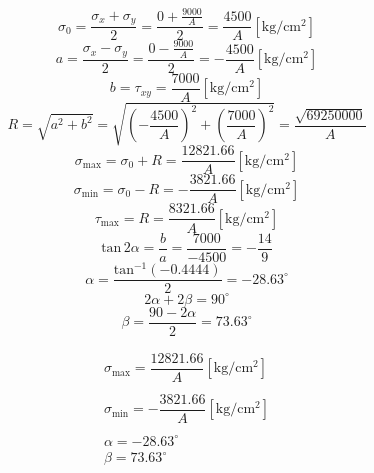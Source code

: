 \documentclass[letter,10pt,twoside]{article}
\begin{document}
\begin{equation*}
    \sigma_0 = \frac{\sigma_x + \sigma_y}{2}
             = \frac{0 + \frac{9000}{A}}{2}
             = \frac{4500}{A}[\text{kg}/\text{cm}^2]
\end{equation*}
\begin{equation*}
    a = \frac{\sigma_x - \sigma_y}{2}
      = \frac{0 - \frac{9000}{A}}{2}
      = - \frac{4500}{A}[\text{kg}/\text{cm}^2]
\end{equation*}
\begin{equation*}
    b = \tau_{xy}
      = \frac{7000}{A}[\text{kg}/\text{cm}^2]
\end{equation*}
\begin{equation*}
    R = \sqrt{a^2 + b^2}
      = \sqrt{\left(-\frac{4500}{A}\right)^2
        + \left(\frac{7000}{A}\right)^2}
      = \frac{\sqrt{69250000}}{A}
\end{equation*}
\begin{equation*}
    \sigma_{\text{max}} = \sigma_0 + R
                        = \frac{12821.66}{A}[\text{kg}/\text{cm}^2]
\end{equation*}
\begin{equation*}
    \sigma_{\text{min}} = \sigma_0 - R
                        = -\frac{3821.66}{A}[\text{kg}/\text{cm}^2]
\end{equation*}
\begin{equation*}
    \tau_{\text{max}} = R
                      = \frac{8321.66}{A}[\text{kg}/\text{cm}^2]
\end{equation*}
\begin{equation*}
    \text{tan}\,2\alpha = \frac{b}{a}
                        = \frac{7000}{-4500}
                        = -\frac{14}{9}
\end{equation*}
\begin{equation*}
    \alpha = \frac{\text{tan}^{-1}(-0.4444)}{2}
           = -28.63^\circ
\end{equation*}
\begin{equation*}
    2\alpha + 2\beta = 90^\circ
\end{equation*}
\begin{equation*}
    \beta = \frac{90 - 2\alpha}{2}
          = 73.63^\circ
\end{equation*}

\begin{equation*}
\boxed{
    \begin{array}{l}
        \sigma_{\text{max}} = \dfrac{12821.66}{A}[\text{kg}/\text{cm}^2] \\
        \\
        \sigma_{\text{min}} = -\dfrac{3821.66}{A}[\text{kg}/\text{cm}^2] \\
        \\
        \alpha = -28.63^\circ \\
        \beta = 73.63^\circ
    \end{array}
}
\end{equation*}
\end{document}
